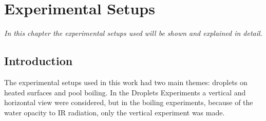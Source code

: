 \chapter{Experimental Setups}
\label{cap:setup}

\textit{In this chapter the experimental setups used will be shown and explained in detail.}

\section{Introduction}

The experimental setups used in this work had two main themes: droplets on heated surfaces and pool boiling. In the Droplets Experiments a vertical and horizontal view were considered, but in the boiling experiments, because of the water opacity to IR radiation, only the vertical experiment was made.




\cleardoublepage